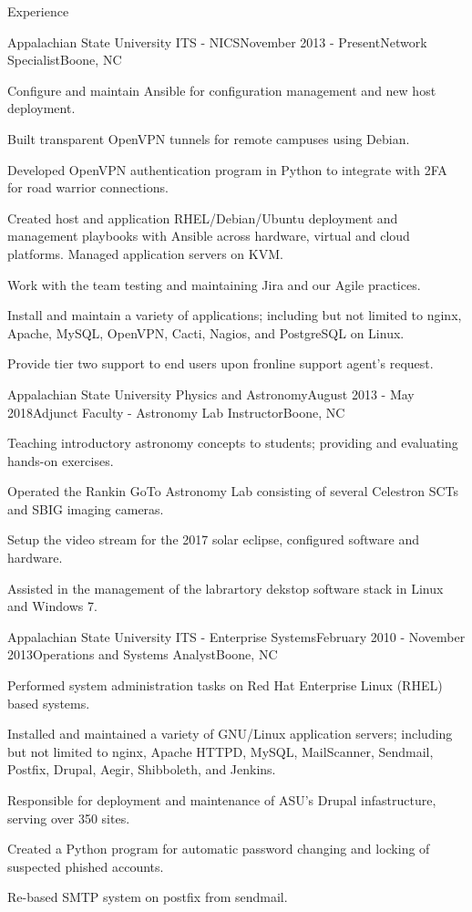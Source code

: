 \documentclass{cv} %
\begin{document}
\begin{rSection}{Experience}

\begin{rSubsection}{Appalachian State University ITS - NICS}{November 2013 - Present}{Network Specialist}{Boone, NC}
\item Configure and maintain Ansible for configuration management and new host deployment.
\item Built transparent OpenVPN tunnels for remote campuses using Debian.
\item Developed OpenVPN authentication program in Python to integrate with 2FA for road warrior connections.
\item Created host and application RHEL/Debian/Ubuntu deployment and management playbooks with Ansible across hardware, virtual and cloud platforms. Managed application servers on KVM.
\item Work with the team testing and maintaining Jira and our Agile practices.
\item Install and maintain a variety of applications; including but not limited to nginx, Apache, MySQL, OpenVPN, Cacti, Nagios, and PostgreSQL on Linux.
\item Provide tier two support to end users upon fronline support agent's request.

\end{rSubsection}

\begin{rSubsection}{Appalachian State University Physics and Astronomy}{August 2013 - May 2018}{Adjunct Faculty - Astronomy Lab Instructor}{Boone, NC}
\item Teaching introductory astronomy concepts to students; providing and evaluating hands-on exercises.
\item Operated the Rankin GoTo Astronomy Lab consisting of several Celestron SCTs and SBIG imaging cameras.
\item Setup the video stream for the 2017 solar eclipse, configured software and hardware.
\item Assisted in the management of the labrartory dekstop software stack in Linux and Windows 7.
\end{rSubsection}

\begin{rSubsection}{Appalachian State University ITS - Enterprise Systems}{February 2010 - November 2013}{Operations and Systems Analyst}{Boone, NC}
\item Performed system administration tasks on Red Hat Enterprise Linux (RHEL) based systems.
\item Installed and maintained a variety of GNU/Linux application servers; including but not limited to nginx, Apache HTTPD, MySQL, MailScanner, Sendmail, Postfix, Drupal, Aegir, Shibboleth, and Jenkins.
\item Responsible for deployment and maintenance of ASU's Drupal infastructure, serving over 350 sites.
\item Created a Python program for automatic password changing and locking of suspected phished accounts.
\item Re-based SMTP system on postfix from sendmail. 
\end{rSubsection}


\end{rSection}
\end{document}
